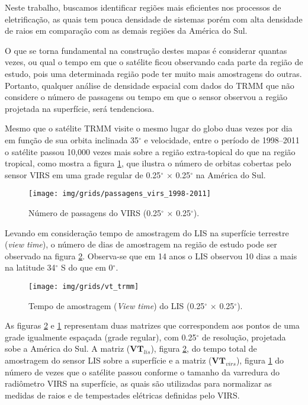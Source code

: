 Neste trabalho, buscamos identificar regiões mais eficientes nos processos de eletrificação, as quais tem pouca densidade de sistemas porém com alta densidade de raios em comparação com as demais regiões da América do Sul.

O que se torna fundamental na construção destes mapas é considerar quantas vezes, ou qual o tempo em que o satélite ficou observando cada parte da região de estudo, pois uma determinada região pode ter muito mais amostragens do outras. Portanto, qualquer análise de densidade espacial com dados do TRMM que não considere o número de passagens ou tempo em que o sensor observou a região projetada na superfície, será tendenciosa.

Mesmo que o satélite TRMM visite o mesmo lugar do globo duas vezes por dia em função de sua orbita inclinada 35$^{\circ}$ e velocidade, entre o período de 1998--2011 o satélite passou 10,000 vezes mais sobre a região extra-topical do que na região tropical, como mostra a figura \ref{VirsVT}, que ilustra o número de orbitas cobertas pelo sensor VIRS em uma grade regular de 0.25$^{\circ}$  $\times$ 0.25$^{\circ}$ na América do Sul.


\begin{figure}[!hb]
  \centering
  {{\texttt{[image: img/grids/passagens\_virs\_1998-2011]}}}
\caption{Número de passagens do VIRS (0.25$^{\circ}$  $\times$ 0.25$^{\circ}$).}
\label{VirsVT}
\end{figure} 




Levando em consideração tempo de amostragem do LIS na superfície terrestre (\textit{view time}), o número de dias de amostragem na região de estudo pode ser observado na figura \ref{lisVT}. Observa-se que em 14 anos o LIS observou 10 dias a mais na latitude 34$^{\circ}$ S do que em 0$^{\circ}$.


\begin{figure}[!ht]
  \centering
  {{\texttt{[image: img/grids/vt\_trmm]}} }
  \caption{Tempo de amostragem (\textit{View time}) do LIS (0.25$^{\circ}$  $\times$ 0.25$^{\circ}$).}
\label{lisVT}
\end{figure} 

As figuras  \ref{lisVT} e \ref{VirsVT} representam duas matrizes que correspondem aos pontos de uma grade igualmente espaçada (grade regular), com 0.25$^{\circ}$ de resolução, projetada sobe a América do Sul. A matriz ($\mathbf{VT}_{lis}$), figura \ref{lisVT}, do tempo total de amostragem do sensor LIS sobre a superfície e a matriz ($\mathbf{VT}_{virs}$), figura \ref{VirsVT} do número de vezes que o satélite passou conforme o tamanho da varredura do radiômetro VIRS na superfície, as quais são utilizadas para normalizar as medidas de raios e de tempestades elétricas definidas pelo VIRS.  

